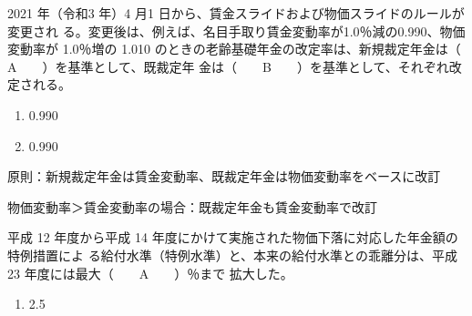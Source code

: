 \begin{fillblank}[]
  2021 年（令和3 年）4 月1 日から、賃金スライドおよび物価スライドのルールが変更され
る。変更後は、例えば、名目手取り賃金変動率が1.0％減の0.990、物価変動率が 1.0％増の
1.010 のときの老齢基礎年金の改定率は、新規裁定年金は（　　A　　）を基準として、既裁定年
金は（　　B　　）を基準として、それぞれ改定される。
\end{fillblank}

\begin{answerbox}
  \begin{enumerate}[A: ]
    \item 0.990
    \item 0.990
  \end{enumerate}
\end{answerbox}

\begin{explanationbox}
  原則：新規裁定年金は賃金変動率、既裁定年金は物価変動率をベースに改訂

  物価変動率＞賃金変動率の場合：既裁定年金も賃金変動率で改訂
\end{explanationbox}

\begin{fillblank}[年金1 H28 問題1(2)H]
   平成 12 年度から平成 14 年度にかけて実施された物価下落に対応した年金額の特例措置によ
る給付水準（特例水準）と、本来の給付水準との乖離分は、平成 23 年度には最大（　　A　　）％まで
拡大した。
\end{fillblank}


\begin{answerbox}
  \begin{enumerate}[A: ]
    \item 2.5
  \end{enumerate}
\end{answerbox}

